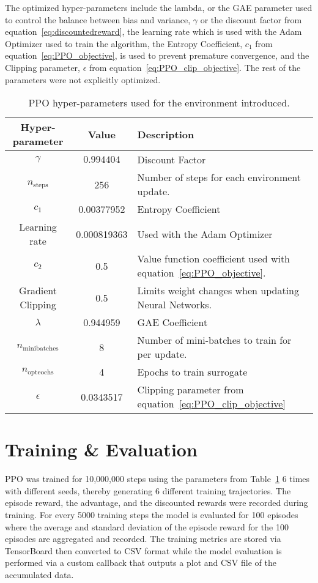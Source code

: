 The optimized hyper-parameters include the lambda, or the GAE parameter used to control the balance between bias and variance, $\gamma$ or the discount factor from equation~\ref{eq:discountedreward}, the learning rate which is used with the Adam Optimizer used to train the algorithm, the Entropy Coefficient, $c_1$ from equation~\ref{eq:PPO_objective}, is used to prevent premature convergence, and the Clipping parameter, $\epsilon$ from equation~\ref{eq:PPO_clip_objective}. The rest of the parameters were not explicitly optimized. 

\begin{table}
	\begin{tabularx}{\columnwidth}{|c|c|X|} \hline
		Hyper-parameter & Value & Description \\\hline
		$\gamma$ & $0.994404$ & Discount Factor\\\hline
		$n_{\text{steps}}$ & 256 & Number of steps for each environment update. \\\hline
		$c_1$ & 0.00377952 & Entropy Coefficient \\\hline
		Learning rate & 0.000819363 & Used with the Adam Optimizer \\\hline
		$c_2$ & 0.5 & Value function coefficient used with equation~\ref{eq:PPO_objective}. \\\hline
		Gradient Clipping & 0.5 & Limits weight changes when updating Neural Networks. \\\hline
		$\lambda$ & 0.944959 & GAE Coefficient \\\hline
		$n_{\text{minibatches}}$ & 8 & Number of mini-batches to train for per update. \\\hline
		$n_{\text{opteochs}}$ & 4 & Epochs to train surrogate \\\hline
		$\epsilon$ & 0.0343517 & Clipping parameter from equation~\ref{eq:PPO_clip_objective} \\\hline
	\end{tabularx}
	\caption{PPO hyper-parameters used for the environment introduced.}\label{table:ppo_parameters}
\end{table}

\section{Training \& Evaluation}

PPO was trained for 10,000,000 steps using the parameters from Table~\ref{table:ppo_parameters} 6 times with different seeds, thereby generating 6 different training trajectories. The episode reward, the advantage, and the discounted rewards were recorded during training. For every 5000 training steps the model is evaluated for 100 episodes where the average and standard deviation of the episode reward for the 100 episodes are aggregated and recorded. The training metrics are stored via TensorBoard then converted to CSV format while the model evaluation is performed via a custom callback that outputs a plot and CSV file of the accumulated data.

